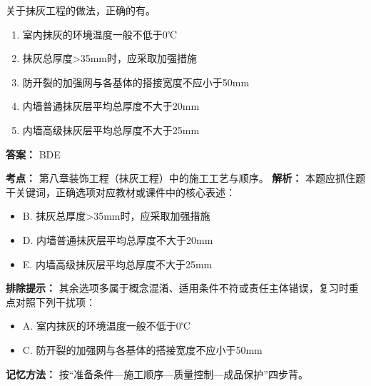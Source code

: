 \documentclass[UTF8,fontset=fandol,11pt]{ctexart}
\begin{document}
\begin{quizbox}[title={第 1 题}]
关于抹灰工程的做法，正确的有。\\
\begin{enumerate}[label=\Alph*.]
\item 室内抹灰的环境温度一般不低于0℃
\item 抹灰总厚度>35mm时，应采取加强措施
\item 防开裂的加强网与各基体的搭接宽度不应小于50mm
\item 内墙普通抹灰层平均总厚度不大于20mm
\item 内墙高级抹灰层平均总厚度不大于25mm
\end{enumerate}
\textbf{答案：} BDE
\vspace{0.25em}
\begin{answerbox}[title={考点解析}]
\textbf{考点：} 第八章装饰工程（抹灰工程）中的施工工艺与顺序。
\textbf{解析：} 本题应抓住题干关键词，正确选项对应教材或课件中的核心表述：
\begin{itemize}
\item B. 抹灰总厚度>35mm时，应采取加强措施
\item D. 内墙普通抹灰层平均总厚度不大于20mm
\item E. 内墙高级抹灰层平均总厚度不大于25mm
\end{itemize}
\textbf{排除提示：} 其余选项多属于概念混淆、适用条件不符或责任主体错误，复习时重点对照下列干扰项：
\begin{itemize}
\item A. 室内抹灰的环境温度一般不低于0℃
\item C. 防开裂的加强网与各基体的搭接宽度不应小于50mm
\end{itemize}
\textbf{记忆方法：} 按“准备条件—施工顺序—质量控制—成品保护”四步背。
\end{answerbox}
\end{quizbox}

\vspace{0.2em}
\end{document}
